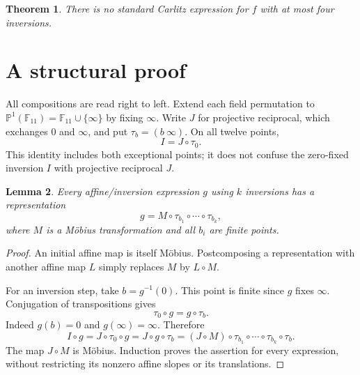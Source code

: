 \documentclass[11pt]{article}
\newtheorem{theorem}{Theorem}
\newtheorem{lemma}[theorem]{Lemma}
\newcommand{\F}{\mathbb F}
\newcommand{\PP}{\mathbb P}
\begin{document}
\begin{theorem}\label{thm:main}
There is no standard Carlitz expression for $f$ with at most four inversions.
\end{theorem}

\section{A structural proof}
All compositions are read right to left. Extend each field permutation to $\PP^1(\F_{11})=\F_{11}\cup\{\infty\}$ by fixing $\infty$. Write $J$ for projective reciprocal, which exchanges $0$ and $\infty$, and put $\tau_b=(b\ \infty)$. On all twelve points,
\[
 I=J\circ\tau_0.
\]
This identity includes both exceptional points; it does not confuse the zero-fixed inversion $I$ with projective reciprocal $J$.

\begin{lemma}\label{lem:star}
Every affine/inversion expression $g$ using $k$ inversions has a representation
\[
 g=M\circ\tau_{b_1}\circ\cdots\circ\tau_{b_k},
\]
where $M$ is a M\"obius transformation and all $b_i$ are finite points.
\end{lemma}
\begin{proof}
An initial affine map is itself M\"obius. Postcomposing a representation with another affine map $L$ simply replaces $M$ by $L\circ M$.

For an inversion step, take $b=g^{-1}(0)$. This point is finite since $g$ fixes $\infty$. Conjugation of transpositions gives
\[
 \tau_0\circ g=g\circ\tau_b.
\]
Indeed $g(b)=0$ and $g(\infty)=\infty$. Therefore
\[
 I\circ g=J\circ\tau_0\circ g
          =J\circ g\circ\tau_b
          =(J\circ M)\circ\tau_{b_1}\circ\cdots\circ\tau_{b_k}\circ\tau_b.
\]
The map $J\circ M$ is M\"obius. Induction proves the assertion for every expression, without restricting its nonzero affine slopes or its translations.
\end{proof}
\end{document}

